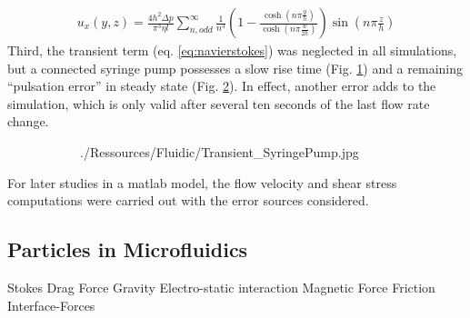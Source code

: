 \begin{align}
 u   _x(y,z) = \frac{4 h^2 \Delta p}{\pi^3 \eta l} \sum_{n,odd}^{\infty} \frac{1}{n^3} \left( 1- \frac{\cosh (n \pi \frac{y}{h})}{\cosh (n \pi \frac{w}{2h})} \right) \sin (n \pi \frac{z}{h}) \label{eq:flowVelocityRect}
\end{align}
Third, the transient term (eq. \ref{eq:navierstokes}) was neglected in all simulations, but a connected syringe pump possesses a slow rise time (Fig. \ref{fig:fluidic:pumpStability:transient}) and a remaining ``pulsation error'' in steady state (Fig. \ref{fig:fluidic:pumpStability:steadystate}). In effect, another error adds to the simulation, which is only valid after several ten seconds of the last flow rate change.

\begin{figure}
	\begin{subfigure}[b]{0.5\textwidth}
		\centering
	    \addtocounter{subfigure}{1}  
		 {./Ressources/Fluidic/Transient_SyringePump.jpg}		
		\addtocounter{subfigure}{-1}  
		\label{fig:fluidic:pumpStability:transient}
	\end{subfigure}%
	\begin{subfigure}[b]{0.5\textwidth}
		\centering
		\addtocounter{subfigure}{1}  
		\addtocounter{subfigure}{-1}  
		\label{fig:fluidic:pumpStability:steadystate}
	\end{subfigure}
\label{fig:fluidic:pumpStability}
\end{figure}

For later studies in a matlab model, the flow velocity and shear stress computations were carried out with the error sources considered. 



\subsection{Particles in Microfluidics}
Stokes Drag Force
Gravity
Electro-static interaction
Magnetic Force
Friction
Interface-Forces
